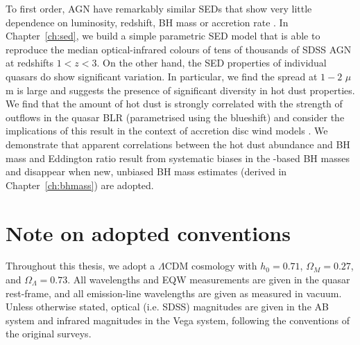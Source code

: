 To first order, AGN have remarkably similar SEDs that show very little dependence on luminosity, redshift, BH mass or accretion rate \citep[e.g.][]{elvis12,hao13}. 
In Chapter~\ref{ch:sed}, we build a simple parametric SED model that is able to reproduce the median optical-infrared colours of tens of thousands of SDSS AGN at redshifts $1<z<3$. 
On the other hand, the SED properties of individual quasars do show significant variation.
In particular, we find the spread at $1-2$ $\mu$m is large and suggests the presence of significant diversity in hot dust properties.
We find that the amount of hot dust is strongly correlated with the strength of outflows in the quasar BLR (parametrised using the  blueshift) and consider the implications of this result in the context of accretion disc wind models \citep[e.g.][]{elitzur06}.
We demonstrate that apparent correlations between the hot dust abundance and BH mass and Eddington ratio result from systematic biases in the -based BH masses and disappear when new, unbiased BH mass estimates (derived in Chapter~\ref{ch:bhmass}) are adopted. 

\section{Note on adopted conventions}

Throughout this thesis, we adopt a $\Lambda$CDM cosmology with $h_0=0.71$, $\Omega_M=0.27$, and $\Omega_\Lambda=0.73$. 
All wavelengths and EQW measurements are given in the quasar rest-frame, and all emission-line wavelengths are given as measured in vacuum.
Unless otherwise stated, optical (i.e. SDSS) magnitudes are given in the AB system and infrared magnitudes in the Vega system, following the conventions of the original surveys. 





